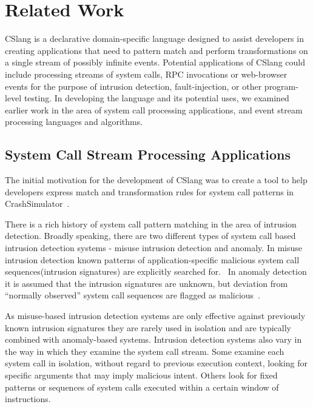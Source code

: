 \section{Related Work}
\label{SEC:related-work}

CSlang is a declarative domain-specific language designed to
assist developers in creating
applications that need to pattern match and perform
transformations on a single stream of possibly infinite events.
Potential applications
of CSlang could include
processing streams of system calls, RPC invocations or
web-browser events for the purpose of intrusion detection, fault-injection, or
other program-level testing.
In developing the language and its potential uses,
we examined
earlier work in the area of system call processing applications,
and event stream processing languages and algorithms.

\subsection{System Call Stream Processing Applications}
The
initial motivation for the development of CSlang was to create a tool to help
developers express match and transformation rules for system call patterns in
CrashSimulator~\cite{DBLP:conf/issre/MooreCFW19}.

There is a rich history of system call pattern
matching in the area of intrusion detection.  Broadly speaking, there are two
different types of system call based intrusion detection systems - misuse
intrusion detection and anomaly. In misuse intrusion
detection known patterns of application-specific malicious system call
sequences(intrusion signatures) are explicitly searched
for.~\cite{GARCIATEODORO200918}
In anomaly
detection it is assumed that the intrusion signatures are unknown, but deviation
from “normally observed” system call sequences are flagged as
malicious~\cite{DBLP:conf/sp/ForrestHSL96}.

As misuse-based intrusion detection systems are only
effective against previously known intrusion signatures they are rarely used in
isolation and are typically combined with anomaly-based systems.
Intrusion
detection systems also vary in the way in which they examine the system call
stream.
Some examine each system call in isolation,
without regard to previous
execution context,
looking for specific arguments that may imply malicious
intent.
Others look for fixed patterns or sequences of system calls executed
within a certain window of instructions.

